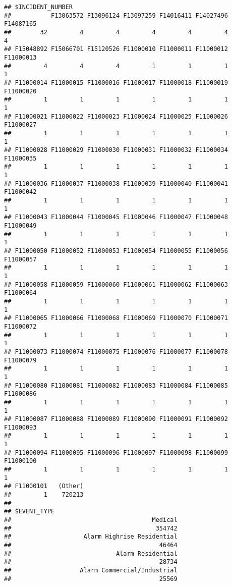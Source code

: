 \documentclass[]{article}
\begin{document}
\begin{verbatim}
## $INCIDENT_NUMBER
##           F13063572 F13096124 F13097259 F14016411 F14027496 F14087165 
##        32         4         4         4         4         4         4 
## F15048892 F15066701 F15120526 F11000010 F11000011 F11000012 F11000013 
##         4         4         4         1         1         1         1 
## F11000014 F11000015 F11000016 F11000017 F11000018 F11000019 F11000020 
##         1         1         1         1         1         1         1 
## F11000021 F11000022 F11000023 F11000024 F11000025 F11000026 F11000027 
##         1         1         1         1         1         1         1 
## F11000028 F11000029 F11000030 F11000031 F11000032 F11000034 F11000035 
##         1         1         1         1         1         1         1 
## F11000036 F11000037 F11000038 F11000039 F11000040 F11000041 F11000042 
##         1         1         1         1         1         1         1 
## F11000043 F11000044 F11000045 F11000046 F11000047 F11000048 F11000049 
##         1         1         1         1         1         1         1 
## F11000050 F11000052 F11000053 F11000054 F11000055 F11000056 F11000057 
##         1         1         1         1         1         1         1 
## F11000058 F11000059 F11000060 F11000061 F11000062 F11000063 F11000064 
##         1         1         1         1         1         1         1 
## F11000065 F11000066 F11000068 F11000069 F11000070 F11000071 F11000072 
##         1         1         1         1         1         1         1 
## F11000073 F11000074 F11000075 F11000076 F11000077 F11000078 F11000079 
##         1         1         1         1         1         1         1 
## F11000080 F11000081 F11000082 F11000083 F11000084 F11000085 F11000086 
##         1         1         1         1         1         1         1 
## F11000087 F11000088 F11000089 F11000090 F11000091 F11000092 F11000093 
##         1         1         1         1         1         1         1 
## F11000094 F11000095 F11000096 F11000097 F11000098 F11000099 F11000100 
##         1         1         1         1         1         1         1 
## F11000101   (Other) 
##         1    720213 
## 
## $EVENT_TYPE
##                                       Medical 
##                                        354742 
##                    Alarm Highrise Residential 
##                                         46464 
##                             Alarm Residential 
##                                         28734 
##                   Alarm Commercial/Industrial 
##                                         25569 

\end{verbatim}
\end{document}
